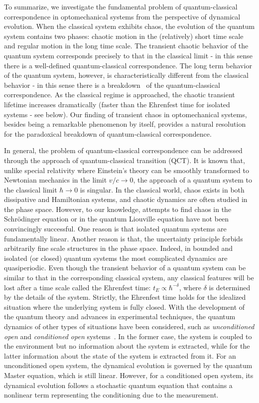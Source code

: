 \documentclass[12pt]{wlscirep}
\begin{document}
To summarize, we investigate the fundamental problem of quantum-classical
correspondence in optomechanical systems from the perspective of dynamical
evolution. When the classical system exhibits chaos, the evolution of the 
quantum system contains two phases: chaotic motion in the (relatively) short 
time scale and regular motion in the long time scale. The transient chaotic 
behavior of the quantum system corresponds precisely to that in the classical 
limit - in this sense there is a well-defined quantum-classical 
correspondence. The long term behavior of the quantum system, however, is 
characteristically different from the classical behavior - in this sense 
there is a breakdown~\cite{BAF:2015} of the quantum-classical correspondence. 
As the classical regime is approached, the chaotic transient lifetime 
increases dramatically (faster than the Ehrenfest time for isolated 
systems - see below). Our finding of transient chaos in optomechanical 
systems, besides being a remarkable phenomenon by itself, provides a natural 
resolution for the paradoxical breakdown of quantum-classical correspondence.

In general, the problem of quantum-classical correspondence can be addressed 
through the approach of quantum-classical transition (QCT). It is known that, 
unlike special relativity where Einstein's theory can be smoothly transformed 
to Newtonian mechanics in the limit $v/c \rightarrow 0$, the approach 
of a quantum system to the classical limit $\hbar\rightarrow0$ is singular. 
In the classical world, chaos exists in both dissipative and Hamiltonian
systems, and chaotic dynamics are often studied in the phase space. 
However, to our knowledge, attempts to find chaos in the Schr\"{o}dinger 
equation or in the quantum Liouville equation have not been convincingly
successful. One reason is that isolated quantum systems are fundamentally 
linear. Another reason is that, the uncertainty principle forbids 
arbitrarily fine scale structures in the phase space. Indeed, in bounded 
and isolated (or closed) quantum systems the most complicated dynamics are 
quasiperiodic. Even though the transient behavior of a quantum system 
can be similar to that in the corresponding classical system, any classical
features will be lost after a time scale called the Ehrenfest time: 
$t_E\propto\hbar^{-\delta}$, where $\delta$ is determined by the details of 
the system. Strictly, the Ehrenfest time holds for the idealized situation
where the underlying system is fully closed. With the development of the 
quantum theory and advances in experimental techniques, the quantum 
dynamics of other types of situations have been considered, such as
{\it unconditioned open} and {\it conditioned open} 
systems~\cite{H:book,BHJ:2000}. In the former case, the system is coupled
to the environment but no information about the system is extracted,
while for the latter information about the state of the system is
extracted from it. For an unconditioned open system, the dynamical evolution 
is governed by the quantum Master equation, which is still linear. However,
for a conditioned open system, its dynamical evolution follows a stochastic 
quantum equation that contains a nonlinear term representing the conditioning 
due to the measurement.
\end{document}
